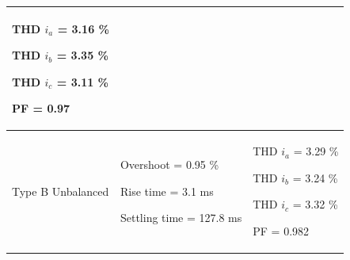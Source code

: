 \begin{table}[htbp]
\begin{tabular}{|m{4cm}|m{5.5cm}|m{4.5cm}|}
\begin{tabitemize}
            \item THD $i_a$ = 3.16 \%
            \item THD $i_b$ = 3.35 \%
            \item THD $i_c$ = 3.11 \%
            \item PF = 0.97
        \end{tabitemize} \\ \hline
        Type B Unbalanced  & 
        \begin{tabitemize}
            \item Overshoot = 0.95 \%
            \item Rise time = 3.1 ms
            \item Settling time = 127.8 ms
        \end{tabitemize} & 
        \begin{tabitemize}
            \item THD $i_a$ = 3.29 \%
            \item THD $i_b$ = 3.24 \%
            \item THD $i_c$ = 3.32 \%
            \item PF = 0.982
        \end{tabitemize} \\ \hline
    \end{tabular}
    \label{tab:performance_summary}
\end{table}